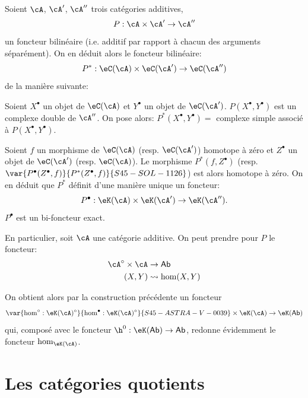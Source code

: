 Soient $\cA$, $\cA'$, $\cA''$ trois catégories additives, 
\[
  P:\cA\times \cA'\to \cA''
\]
un foncteur bilinéaire (i.e. additif par rapport à chacun des arguments 
séparément). On en déduit alors le foncteur bilinéaire: 
\[
  P^\ast:\eC(\cA)\times \eC(\cA') \to \eC(\cA'') 
\]
de la manière suivante: 

Soient $X^\bullet$ un objet de $\eC(\cA)$ et $Y^\bullet$ un objet de 
$\eC(\cA')$. $P(X^\bullet,Y^\bullet)$ est un complexe double de $\cA''$. On 
pose alors: $P^\ast(X^\bullet,Y^\bullet) = $ complexe simple associé à 
$P(X^\bullet,Y^\bullet)$. 

Soient $f$ un morphisme de $\eC(\cA)$ (resp. $\eC(\cA')$) homotope à zéro 
et $Z^\bullet$ un objet de $\eC(\cA')$ (resp. $\eC(\cA)$). Le morphisme 
$P^\ast(f,Z^\bullet)$ (resp. $\var{P^\bullet(Z^\bullet,f)}{P^\ast(Z^\bullet,f)}{S45-SOL-1126}$) est alors homotope à 
zéro. On en déduit que $P^\ast$ définit d'une manière unique un 
foncteur: 
\[
  P^\bullet:\eK(\cA) \times \eK(\cA') \to \eK(\cA'') \text{.}
\]
$P^\bullet$ est un bi-foncteur exact. 

En particulier, soit $\cA$ une catégorie additive. On peut prendre pour $P$ le 
foncteur: 
\begin{align*}
  \cA^\circ\times \cA &\to \mathsf{Ab} \\
  (X,Y) &\leadsto \hom(X,Y) 
\end{align*}

On obtient alors par la construction précédente un foncteur 
\[
  \var{\hom^\circ:\eK(\cA)^\circ}{\hom^\bullet:\eK(\cA)^\circ}{S45-ASTRA-V-0039} \times \eK(\cA) \to \eK(\mathsf{Ab}) 
\]
qui, composé avec le foncteur $\h^0:\eK(\mathsf{Ab})\to \mathsf{Ab}$, 
redonne évidemment le foncteur $\hom_{\eK(\cA)}$. 




















\section{Les catégories quotients}\label{VIII:2}










